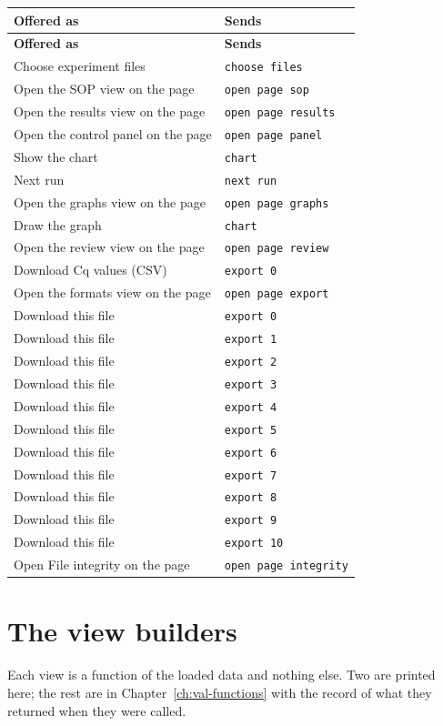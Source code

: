 {\small
\begin{xltabular}{\linewidth}{|X|l|}
\toprule \textbf{Offered as} & \textbf{Sends} \\\midrule\endfirsthead
\toprule \textbf{Offered as} & \textbf{Sends} \\\midrule\endhead
Choose experiment files & \texttt{choose files} \\
Open the SOP view on the page & \texttt{open page sop} \\
Open the results view on the page & \texttt{open page results} \\
Open the control panel on the page & \texttt{open page panel} \\
Show the chart & \texttt{chart} \\
Next run & \texttt{next run} \\
Open the graphs view on the page & \texttt{open page graphs} \\
Draw the graph & \texttt{chart} \\
Open the review view on the page & \texttt{open page review} \\
Download Cq values (CSV) & \texttt{export 0} \\
Open the formats view on the page & \texttt{open page export} \\
Download this file & \texttt{export 0} \\
Download this file & \texttt{export 1} \\
Download this file & \texttt{export 2} \\
Download this file & \texttt{export 3} \\
Download this file & \texttt{export 4} \\
Download this file & \texttt{export 5} \\
Download this file & \texttt{export 6} \\
Download this file & \texttt{export 7} \\
Download this file & \texttt{export 8} \\
Download this file & \texttt{export 9} \\
Download this file & \texttt{export 10} \\
Open File integrity on the page & \texttt{open page integrity} \\
\bottomrule
\end{xltabular}}


\section{The view builders}
Each view is a function of the loaded data and nothing else. Two are printed here;
the rest are in Chapter~\ref{ch:val-functions} with the record of what they
returned when they were called.

